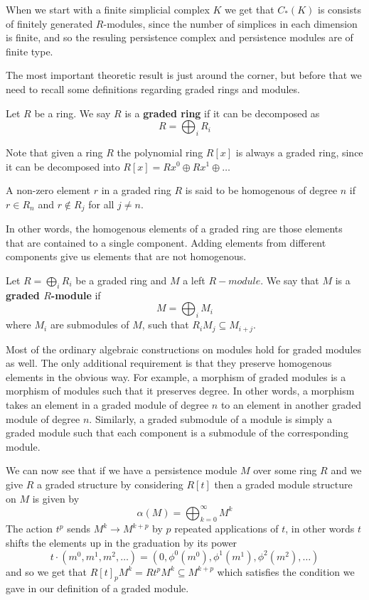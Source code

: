 When we start with a finite simplicial complex $K$ we get that $C_{*}(K)$ is consists of finitely generated $R$-modules, since the number of simplices in each dimension is finite, and so the resuling persistence complex and persistence modules are of finite type.

The most important theoretic result is just around the corner, but before that we need to recall some definitions regarding graded rings and modules.

\begin{definition}
  Let $R$ be a ring. We say $R$ is a \textbf{graded ring} if it can be decomposed as
  \[ R = \bigoplus_{i} R_{i}\]
\end{definition}
Note that given a ring $R$ the polynomial ring $R[x]$ is always a graded ring, since it can be decomposed into $R[x] = Rx^{0} \oplus Rx^{1} \oplus \dots$

\begin{definition}
A non-zero element $r$ in a graded ring $R$ is said to be homogenous of degree $n$ if $r \in R_{n}$ and $r \not \in R_{j}$ for all $j \neq n$.
\end{definition}

In other words, the homogenous elements of a graded ring are those elements that are contained to a single component. Adding elements from different components give us elements that are not homogenous.
\begin{definition}
  Let $R = \bigoplus_{{i}} R_{i}$ be a graded ring and $M$ a left $R-module$. We say that $M$ is a \textbf{graded $R$-module} if
  \[M = \bigoplus_{i} M_{i} \]
  where $M_{i}$ are submodules of $M$, such that $R_{i}M_{j} \subseteq M_{i+j}$.
\end{definition}

Most of the ordinary algebraic constructions on modules hold for graded modules as well. The only additional requirement is that they preserve homogenous elements in the obvious way. For example, a morphism of graded modules is a morphism of modules such that it preserves degree. In other words, a morphism takes an element in a graded module of degree $n$ to an element in another graded module of degree $n$. Similarly, a graded submodule of a module is simply a graded module such that each component is a submodule of the corresponding module.

We can now see that if we have a persistence module $M$ over some ring $R$ and we give $R$ a graded structure by considering $R[t]$ then a graded module structure on $M$ is given by
\[ \alpha(M) = \bigoplus^{\infty}_{k=0} M^{k}\]
The action $t^{p}$ sends $M^{k} \to M^{k+p}$ by $p$ repeated applications of $t$, in other words $t$ shifts the elements up in the graduation by its power
\[ t \cdot (m^{0}, m^{1}, m^{2}, \dots  ) = (0, \phi^{0}(m^{0}), \phi^{1}(m^{1}),\phi^{2}(m^{2}),\dots) \]
and so we get that $R[t]_{p}M^{k} = Rt^{p}M^{k} \subseteq M^{k+p}$ which satisfies the condition we gave in our definition of a graded module.

